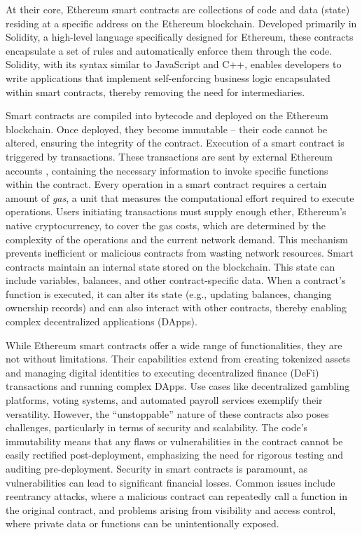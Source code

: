 At their core, Ethereum smart contracts are collections of code and data (state) residing at a specific address on the Ethereum blockchain. Developed primarily in Solidity, a high-level language specifically designed for Ethereum, these contracts encapsulate a set of rules and automatically enforce them through the code. Solidity, with its syntax similar to JavaScript and C++, enables developers to write applications that implement self-enforcing business logic encapsulated within smart contracts, thereby removing the need for intermediaries.

Smart contracts are compiled into bytecode and deployed on the Ethereum blockchain. Once deployed, they become immutable – their code cannot be altered, ensuring the integrity of the contract. Execution of a smart contract is triggered by transactions. These transactions are sent by external Ethereum accounts , containing the necessary information to invoke specific functions within the contract. Every operation in a smart contract requires a certain amount of \textit{gas}, a unit that measures the computational effort required to execute operations. Users initiating transactions must supply enough ether, Ethereum's native cryptocurrency, to cover the gas costs, which are determined by the complexity of the operations and the current network demand. This mechanism prevents inefficient or malicious contracts from wasting network resources. Smart contracts maintain an internal state stored on the blockchain. This state can include variables, balances, and other contract-specific data. When a contract's function is executed, it can alter its state (e.g., updating balances, changing ownership records) and can also interact with other contracts, thereby enabling complex decentralized applications (DApps).

While Ethereum smart contracts offer a wide range of functionalities, they are not without limitations. Their capabilities extend from creating tokenized assets and managing digital identities to executing decentralized finance (DeFi) transactions and running complex DApps. Use cases like decentralized gambling platforms, voting systems, and automated payroll services exemplify their versatility. However, the ``unstoppable'' nature of these contracts also poses challenges, particularly in terms of security and scalability. The code's immutability means that any flaws or vulnerabilities in the contract cannot be easily rectified post-deployment, emphasizing the need for rigorous testing and auditing pre-deployment. Security in smart contracts is paramount, as vulnerabilities can lead to significant financial losses. Common issues include reentrancy attacks, where a malicious contract can repeatedly call a function in the original contract, and problems arising from visibility and access control, where private data or functions can be unintentionally exposed. 

